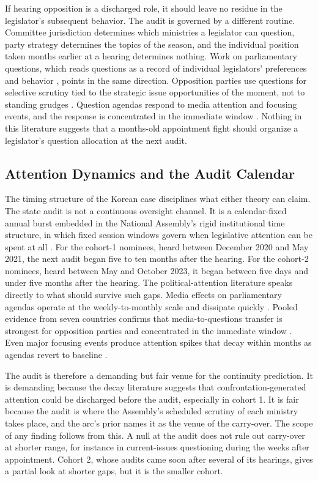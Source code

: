 \documentclass[11pt]{article}
\begin{document}
If hearing opposition is a discharged role, it should leave no residue in the legislator's subsequent behavior. The audit is governed by a different routine. Committee jurisdiction determines which ministries a legislator can question, party strategy determines the topics of the season, and the individual position taken months earlier at a hearing determines nothing. Work on parliamentary questions, which reads questions as a record of individual legislators' preferences and behavior \citep{martin2011}, points in the same direction. Opposition parties use questions for selective scrutiny tied to the strategic issue opportunities of the moment, not to standing grudges \citep{senninger2017}. Question agendas respond to media attention and focusing events, and the response is concentrated in the immediate window \citep{walgrave2007, vliegenthart2016}. Nothing in this literature suggests that a months-old appointment fight should organize a legislator's question allocation at the next audit.

\subsection{Attention Dynamics and the Audit Calendar}

The timing structure of the Korean case disciplines what either theory can claim. The state audit is not a continuous oversight channel. It is a calendar-fixed annual burst embedded in the National Assembly's rigid institutional time structure, in which fixed session windows govern when legislative attention can be spent at all \citep{ka2025}. For the cohort-1 nominees, heard between December 2020 and May 2021, the next audit began five to ten months after the hearing. For the cohort-2 nominees, heard between May and October 2023, it began between five days and under five months after the hearing. The political-attention literature speaks directly to what should survive such gaps. Media effects on parliamentary agendas operate at the weekly-to-monthly scale and dissipate quickly \citep{walgrave2007}. Pooled evidence from seven countries confirms that media-to-questions transfer is strongest for opposition parties and concentrated in the immediate window \citep{vliegenthart2016}. Even major focusing events produce attention spikes that decay within months as agendas revert to baseline \citep{birkland1998}.

The audit is therefore a demanding but fair venue for the continuity prediction. It is demanding because the decay literature suggests that confrontation-generated attention could be discharged before the audit, especially in cohort 1. It is fair because the audit is where the Assembly's scheduled scrutiny of each ministry takes place, and the arc's prior names it as the venue of the carry-over. The scope of any finding follows from this. A null at the audit does not rule out carry-over at shorter range, for instance in current-issues questioning during the weeks after appointment. Cohort 2, whose audits came soon after several of its hearings, gives a partial look at shorter gaps, but it is the smaller cohort.
\end{document}
